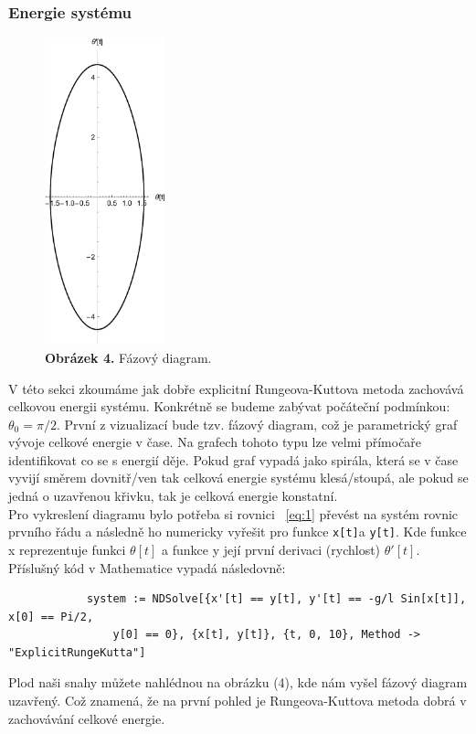 \documentclass[reqno, a4paper]{amsart}
\begin{document}
		\subsubsection{Energie systému}
		\label{sec:sys-energy}
		\begin{figure}
			\includegraphics[width=3.5cm]{Runge - Kutta, Fazovy diagram}
			\caption*{\textbf{Obrázek 4.} Fázový diagram.}
		\end{figure}
		V této sekci zkoumáme jak dobře explicitní Rungeova-Kuttova metoda zachovává celkovou energii systému. Konkrétně se budeme zabývat počáteční podmínkou: $\theta_{0} = \pi /2$. První z vizualizací bude tzv. fázový diagram, což je parametrický graf vývoje celkové energie v čase. Na grafech tohoto typu lze velmi přímočaře identifikovat co se s energií děje. Pokud graf vypadá jako spirála, která se v čase vyvijí směrem dovnitř/ven tak celková energie systému klesá/stoupá, ale pokud se jedná o uzavřenou křivku, tak je celková energie konstatní.\\
		Pro vykreslení diagramu bylo potřeba si rovnici ~\eqref{eq:1} převést na systém rovnic prvního řádu a následně ho numericky vyřešit pro funkce \verb|x[t]|a \verb|y[t]|. Kde funkce x reprezentuje funkci $\theta [t]$ a funkce y její první derivaci (rychlost) $\theta' [t]$. Příslušný kód v Mathematice vypadá následovně:
		\begin{verbatim}
			system := NDSolve[{x'[t] == y[t], y'[t] == -g/l Sin[x[t]], x[0] == Pi/2,
				y[0] == 0}, {x[t], y[t]}, {t, 0, 10}, Method -> "ExplicitRungeKutta"]
		\end{verbatim}
		Plod naši snahy můžete nahlédnou na obrázku (4), kde nám vyšel fázový diagram uzavřený. Což znamená, že na první pohled je Rungeova-Kuttova metoda dobrá v zachovávání celkové energie.\\ \\
\end{document}
